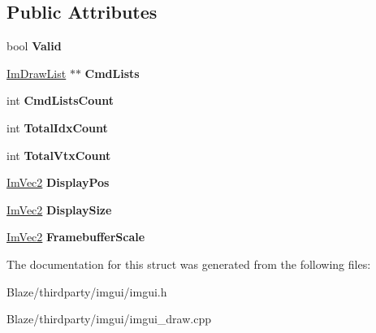\subsection*{Public Attributes}
\begin{DoxyCompactItemize}
\item 
\mbox{\label{structImDrawData_ad01ab9ce5e8843b7860ccbb3eb9a6554}} 
bool {\bfseries Valid}
\item 
\mbox{\label{structImDrawData_a9e93fe7e620eb2e9f61e3b689d617edc}} 
\hyperlink{structImDrawList}{Im\+Draw\+List} $\ast$$\ast$ {\bfseries Cmd\+Lists}
\item 
\mbox{\label{structImDrawData_adc0bbc2881c15f78bdabe51d82582f4e}} 
int {\bfseries Cmd\+Lists\+Count}
\item 
\mbox{\label{structImDrawData_a1ac8a5d441f464628295ef91a0602fc5}} 
int {\bfseries Total\+Idx\+Count}
\item 
\mbox{\label{structImDrawData_af0035b52cdf91932b25eaf2da853965a}} 
int {\bfseries Total\+Vtx\+Count}
\item 
\mbox{\label{structImDrawData_a1e7755e98f5e24b1f4d9152766e6346e}} 
\hyperlink{structImVec2}{Im\+Vec2} {\bfseries Display\+Pos}
\item 
\mbox{\label{structImDrawData_a74d53447c8882a3ce6dc7aaa3e081f39}} 
\hyperlink{structImVec2}{Im\+Vec2} {\bfseries Display\+Size}
\item 
\mbox{\label{structImDrawData_ad57d704d2e5aecd79454c98c8a8111ec}} 
\hyperlink{structImVec2}{Im\+Vec2} {\bfseries Framebuffer\+Scale}
\end{DoxyCompactItemize}


The documentation for this struct was generated from the following files\+:\begin{DoxyCompactItemize}
\item 
Blaze/thirdparty/imgui/imgui.\+h\item 
Blaze/thirdparty/imgui/imgui\+\_\+draw.\+cpp\end{DoxyCompactItemize}
